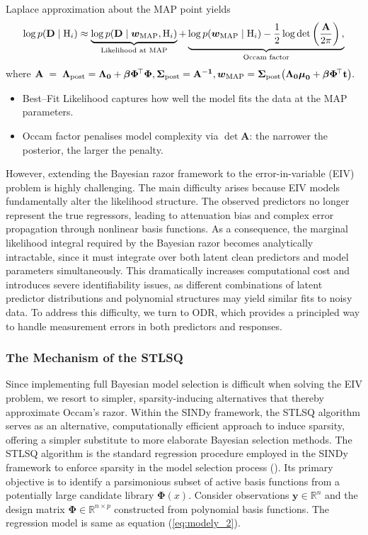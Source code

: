 Laplace approximation about the MAP point
yields
\[
\log p(\mathbf{D} \mid \mathrm{H}_i) \approx
\underbrace{\log p(\mathbf D \mid \boldsymbol{w}_{\mathrm{MAP}},\mathrm{H}_i)}_{\text{Likelihood at MAP}}
+
\underbrace{\log p(\boldsymbol{w}_{\mathrm{MAP}}\mid \mathrm{H}_i) - \frac{1}{2} \log\det\left( \frac{\bf{A}}{2\pi}\right),}_{\text{Occam factor}}
\]
where
$\bf{A} \;=\; \bf{\Lambda}_{\text{post}}
       = \mathbf{\Lambda}_0 + \boldsymbol{\beta} \Phi^{\!\top} \Phi,
\bf{\Sigma}_{\text{post}} = \bf{A}^{-1},  
\boldsymbol{w}_{\mathrm{MAP}}
       = \bf{\Sigma}_{\text{post}}
         \bigl(\mathbf{\Lambda}_0 \boldsymbol\mu_0 + \boldsymbol{\beta} \Phi^{\!\top} \mathbf t \bigr).$

\smallskip
\begin{itemize}\setlength\itemsep{2pt}
  \item Best–Fit Likelihood captures how well the model fits the data at the MAP parameters.
  \item Occam factor penalises model complexity via $\det \mathbf{A}$: the narrower the posterior, the larger the penalty.
\end{itemize}

However, extending the Bayesian razor framework to the error-in-variable (EIV) problem is highly challenging. The main difficulty arises because EIV models fundamentally alter the likelihood structure. The observed predictors no longer represent the true regressors, leading to attenuation bias and complex error propagation through nonlinear basis functions. As a consequence, the marginal likelihood integral required by the Bayesian razor becomes analytically intractable, since it must integrate over both latent clean predictors and model parameters simultaneously. This dramatically increases computational cost and introduces severe identifiability issues, as different combinations of latent predictor distributions and polynomial structures may yield similar fits to noisy data. 
To address this difficulty, we turn to ODR, which provides a principled way to handle measurement errors in both predictors and responses.

\subsubsection{The Mechanism of the STLSQ}
Since implementing full Bayesian model selection is difficult when solving the EIV problem, we resort to simpler, sparsity-inducing alternatives that thereby approximate Occam’s razor.
Within the SINDy framework, the STLSQ algorithm serves as an alternative, computationally efficient approach to induce sparsity, offering a simpler substitute to more elaborate Bayesian selection methods.
The STLSQ algorithm is the standard regression procedure employed in the SINDy framework to enforce sparsity in the model selection process (\cite{brunton2016}). Its primary objective is to identify a parsimonious subset of active basis functions from a potentially large candidate library $\mathbf{\Phi}(x)$. Consider observations $\boldsymbol{y} \in \mathbb{R}^n$ and the design matrix $\mathbf{\Phi} \in \mathbb{R}^{n \times p}$ constructed from polynomial basis functions. The regression model is same as equation  (\ref{eq:modely_2}).

